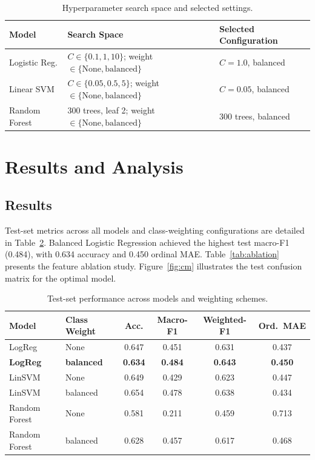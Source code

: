 \documentclass[conference,10pt,a4paper]{IEEEtran}
\begin{document}
\begin{table}[h]
\centering
\caption{Hyperparameter search space and selected settings.}
\label{tab:hypers}
\small
\begin{tabular}{p{1.6cm}p{3.5cm}p{2.2cm}}
\toprule
Model & Search Space & Selected Configuration \\
\midrule
Logistic Reg. & $C \in \{0.1, 1, 10\}$; weight $\in \{\text{None}, \text{balanced}\}$ & $C=1.0$, balanced \\
Linear SVM & $C \in \{0.05, 0.5, 5\}$; weight $\in \{\text{None}, \text{balanced}\}$ & $C=0.05$, balanced \\
Random Forest & 300 trees, leaf 2; weight $\in \{\text{None}, \text{balanced}\}$ & 300 trees, balanced \\
\bottomrule
\end{tabular}
\end{table}

\section{Results and Analysis}
\subsection{Results}
Test-set metrics across all models and class-weighting configurations are detailed in Table~\ref{tab:results}. Balanced Logistic Regression achieved the highest test macro-F1 (0.484), with 0.634 accuracy and 0.450 ordinal MAE. Table~\ref{tab:ablation} presents the feature ablation study. Figure~\ref{fig:cm} illustrates the test confusion matrix for the optimal model.

\begin{table}[h]
\centering
\caption{Test-set performance across models and weighting schemes.}
\label{tab:results}
\small
\begin{tabular}{llcccc}
\toprule
Model & Class Weight & Acc. & Macro-F1 & Weighted-F1 & Ord.\ MAE \\
\midrule
LogReg & None & 0.647 & 0.451 & 0.631 & 0.437 \\
\textbf{LogReg} & \textbf{balanced} & \textbf{0.634} & \textbf{0.484} & \textbf{0.643} & \textbf{0.450} \\
LinSVM & None & 0.649 & 0.429 & 0.623 & 0.447 \\
LinSVM & balanced & 0.654 & 0.478 & 0.638 & 0.434 \\
Random Forest & None & 0.581 & 0.211 & 0.459 & 0.713 \\
Random Forest & balanced & 0.628 & 0.457 & 0.617 & 0.468 \\
\bottomrule
\end{tabular}
\end{table}
\end{document}
